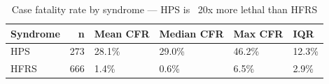 \begin{table}[htbp]
\caption{Case fatality rate by syndrome — HPS is ~20x more lethal than HFRS}
\label{tab:cfr_syndrome}
\begin{tabular}{lrllll}
\toprule
Syndrome & n & Mean CFR & Median CFR & Max CFR & IQR \\
\midrule
HPS & 273 & 28.1\% & 29.0\% & 46.2\% & 12.3\% \\
HFRS & 666 & 1.4\% & 0.6\% & 6.5\% & 2.9\% \\
\bottomrule
\end{tabular}
\end{table}
